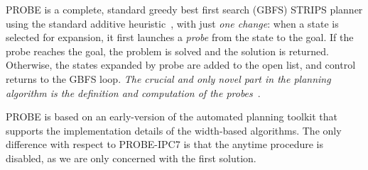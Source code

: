 PROBE is a complete, standard greedy best first search (GBFS) STRIPS
planner using the standard {additive heuristic}~\cite{bonet:aij-hsp},
with just \emph{one change}: when a state is selected for expansion,
it first launches a \emph{probe} from the state to the goal. If the
probe reaches the goal, the problem is solved and the solution is
returned. Otherwise, the states expanded by probe are added to the
open list, and control returns to the GBFS loop.  \emph{The crucial
  and only novel part in the planning algorithm is the definition and
  computation of the probes}~\cite{nir:icaps11}.

PROBE is based on an early-version of the automated planning toolkit
that supports the implementation details of the width-based
algorithms. The only difference with respect to PROBE-IPC7 is that the
anytime procedure is disabled, as we are only concerned with the first
solution.
